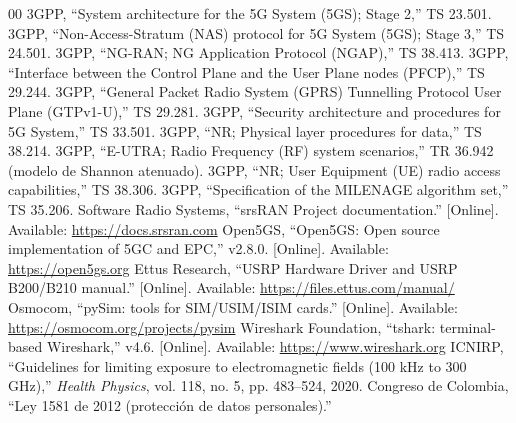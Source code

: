 \documentclass[conference]{IEEEtran}
\begin{document}
\begin{thebibliography}{00}
 3GPP, ``System architecture for the 5G System (5GS); Stage 2,'' TS 23.501.
 3GPP, ``Non-Access-Stratum (NAS) protocol for 5G System (5GS); Stage 3,'' TS 24.501.
 3GPP, ``NG-RAN; NG Application Protocol (NGAP),'' TS 38.413.
 3GPP, ``Interface between the Control Plane and the User Plane nodes (PFCP),'' TS 29.244.
 3GPP, ``General Packet Radio System (GPRS) Tunnelling Protocol User Plane (GTPv1-U),'' TS 29.281.
 3GPP, ``Security architecture and procedures for 5G System,'' TS 33.501.
 3GPP, ``NR; Physical layer procedures for data,'' TS 38.214.
 3GPP, ``E-UTRA; Radio Frequency (RF) system scenarios,'' TR 36.942 (modelo de Shannon atenuado).
 3GPP, ``NR; User Equipment (UE) radio access capabilities,'' TS 38.306.
 3GPP, ``Specification of the MILENAGE algorithm set,'' TS 35.206.
 Software Radio Systems, ``srsRAN Project documentation.'' [Online]. Available: \url{https://docs.srsran.com}
 Open5GS, ``Open5GS: Open source implementation of 5GC and EPC,'' v2.8.0. [Online]. Available: \url{https://open5gs.org}
 Ettus Research, ``USRP Hardware Driver and USRP B200/B210 manual.'' [Online]. Available: \url{https://files.ettus.com/manual/}
 Osmocom, ``pySim: tools for SIM/USIM/ISIM cards.'' [Online]. Available: \url{https://osmocom.org/projects/pysim}
 Wireshark Foundation, ``tshark: terminal-based Wireshark,'' v4.6. [Online]. Available: \url{https://www.wireshark.org}
 ICNIRP, ``Guidelines for limiting exposure to electromagnetic fields (100 kHz to 300 GHz),'' \textit{Health Physics}, vol. 118, no. 5, pp. 483--524, 2020.
 Congreso de Colombia, ``Ley 1581 de 2012 (protección de datos personales).''
\end{thebibliography}
\end{document}
